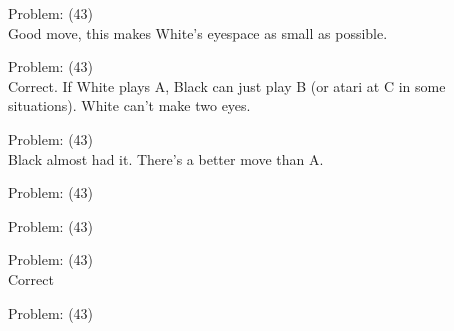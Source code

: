 \documentclass[11pt]{article}
\begin{document}
\begin{minipage}[t]{0.5\textwidth}
  {\centering
  
Problem: (43)\\
Good move, this makes White's eyespace as small as possible.\\
  }
\end{minipage}
\begin{minipage}[t]{0.5\textwidth}
  {\centering
  
Problem: (43)\\
Correct. If White plays A, Black can just play B (or atari at C in some situations). White can't make two eyes.\\
  }
\end{minipage}
\begin{minipage}[t]{0.5\textwidth}
  {\centering
  
Problem: (43)\\
Black almost had it. There's a better move than A.\\
  }
\end{minipage}
\begin{minipage}[t]{0.5\textwidth}
  {\centering
  
Problem: (43)\\
  }
\end{minipage}
\begin{minipage}[t]{0.5\textwidth}
  {\centering
  
Problem: (43)\\
  }
\end{minipage}
\begin{minipage}[t]{0.5\textwidth}
  {\centering
  
Problem: (43)\\
Correct\\
  }
\end{minipage}
\begin{minipage}[t]{0.5\textwidth}
  {\centering
  
Problem: (43)\\
  }
\end{minipage}
\end{document}
